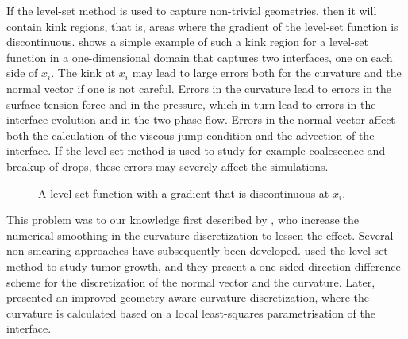 \documentclass[11pt,b5paper,DIV=calc,BCOR1.3cm,headings=small,%
               footinclude=false,headsepline]{scrbook}
\begin{document}
If the level-set method is used to capture non-trivial geometries, then it will
contain kink regions, that is, areas where the gradient of the level-set
function is discontinuous.   shows a simple
example of such a kink region for a level-set function in a one-dimensional
domain that captures two interfaces, one on each side of $x_i$.  The kink at
$x_i$ may lead to large errors both for the curvature and the normal vector if
one is not careful.  Errors in the curvature lead to errors in the surface
tension force and in the pressure, which in turn lead to errors in the
interface evolution and in the two-phase flow.  Errors in the normal vector
affect both the calculation of the viscous jump condition and the advection of
the interface.  If the level-set method is used to study for example
coalescence and breakup of drops, these errors may severely affect the
simulations.
\begin{figure}[tbp]
  \centering
  \caption{A level-set function with a gradient that is discontinuous at
    $x_i$.}
  \label{fig:level-set-function}
\end{figure}

This problem was to our knowledge first described by \citet{Smereka03}, who
increase the numerical smoothing in the curvature discretization to lessen the
effect.  Several non-smearing approaches have subsequently been developed.
\citet{Macklin05} used the level-set method to study tumor growth, and they
present a one-sided direction-difference scheme for the discretization of the
normal vector and the curvature.  Later, \citet{Macklin06} presented an
improved geometry-aware curvature discretization, where the curvature is
calculated based on a local least-squares parametrisation of the interface.
\end{document}
